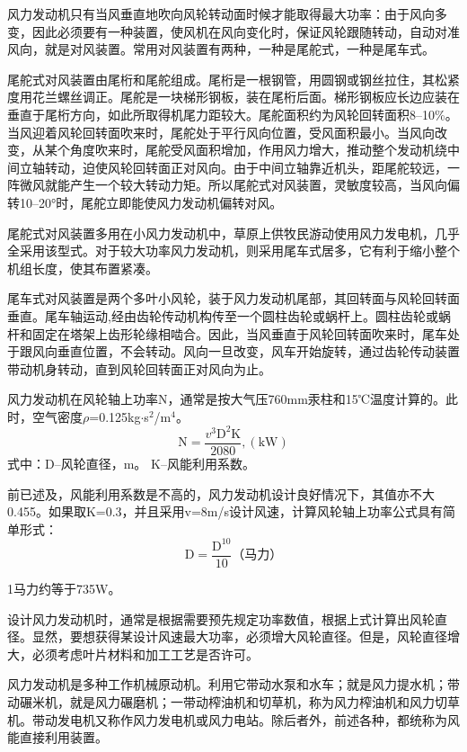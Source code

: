 \documentclass{ctexbook}
\begin{document}
风力发动机只有当风垂直地吹向风轮转动面时候才能取得最大功率：由于风向多变，因此必须要有一种装置，使风机在风向变化时，保证风轮跟随转动，自动对准风向，就是对风装置。常用对风装置有两种，一种是尾舵式，一种是尾车式。

尾舵式对风装置由尾桁和尾舵组成。尾桁是一根钢管，用圆钢或钢丝拉住，其松紧度用花兰螺丝调正。尾舵是一块梯形钢板，装在尾桁后面。梯形钢板应长边应装在垂直于尾桁方向，如此所取得机尾力距较大。尾舵面积约为风轮回转面积8--10\%。当风迎着风轮回转面吹来时，尾舵处于平行风向位置，受风面积最小。当风向改变，从某个角度吹来时，尾舵受风面积增加，作用风力增大，推动整个发动机绕中间立轴转动，迫使风轮回转面正对风向。由于中间立轴靠近机头，距尾舵较远，一阵微风就能产生一个较大转动力矩。所以尾舵式对风装置，灵敏度较高，当风向偏转10--20°时，尾舵立即能使风力发动机偏转对风。

尾舵式对风装置多用在小风力发动机中，草原上供牧民游动使用风力发电机，几乎全采用该型式。对于较大功率风力发动机，则采用尾车式居多，它有利于缩小整个机组长度，使其布置紧凑。

尾车式对风装置是两个多叶小风轮，装于风力发动机尾部，其回转面与风轮回转面垂直。尾车轴运动,经由齿轮传动机构传至一个圆柱齿轮或蜗杆上。圆柱齿轮或蜗杆和固定在塔架上齿形轮缘相啮合。因此，当风垂直于风轮回转面吹来时，尾车处于跟风向垂直位置，不会转动。风向一旦改变，风车开始旋转，通过齿轮传动装置带动机身转动，直到风轮回转面正对风向为止。

风力发动机在风轮轴上功率N，通常是按大气压760mm汞柱和15℃温度计算的。此时，空气密度$\rho$=0.125kg$\cdot$s$^{2}$/m$^4$。
\begin{equation*}
	\text{N}=\frac{v^{3}\text{D}^{2}\text{K}}{2080} , (\text{kW})
\end{equation*}
式中：D--风轮直径，m。
K--风能利用系数。

前已述及，风能利用系数是不高的，风力发动机设计良好情况下，其值亦不大0.455。如果取K=0.3，并且采用v=8m/s设计风速，计算风轮轴上功率公式具有简单形式：
\begin{equation*}
	\text{D}=\frac{\text{D}^{10}}{10} \text{（马力）}
\end{equation*}

1马力约等于735W。

设计风力发动机时，通常是根据需要预先规定功率数值，根据上式计算出风轮直径。显然，要想获得某设计风速最大功率，必须增大风轮直径。但是，风轮直径增大，必须考虑叶片材料和加工工艺是否许可。

风力发动机是多种工作机械原动机。利用它带动水泵和水车；就是风力提水机；带动碾米机，就是风力碾磨机；一带动榨油机和切草机，称为风力榨油机和风力切草机。带动发电机又称作风力发电机或风力电站。除后者外，前述各种，都统称为风能直接利用装置。
\end{document}
